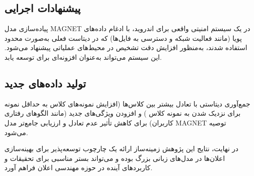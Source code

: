 \subsection{پیشنهادات اجرایی}
پیاده‌سازی مدل MAGNET در یک سیستم امنیتی واقعی برای اندروید، با ادغام داده‌های پویا (مانند فعالیت شبکه و دسترسی به فایل‌ها) که در دیتاست فعلی به‌صورت محدود استفاده شدند، به‌منظور افزایش دقت تشخیص در محیط‌های عملیاتی پیشنهاد می‌شود. این سیستم می‌تواند به‌عنوان افزونه‌ای برای  \cite{GooglePlayProtect} توسعه یابد.

\subsection{تولید داده‌های جدید}
جمع‌آوری دیتاستی با تعادل بیشتر بین کلاس‌ها (افزایش نمونه‌های کلاس  به حداقل  نمونه برای نزدیک شدن به  نمونه کلاس ) و افزودن ویژگی‌های جدید (مانند الگوهای رفتاری کاربران) برای کاهش تأثیر عدم تعادل و ارزیابی جامع‌تر مدل MAGNET توصیه می‌شود.

در نهایت، نتایج این پژوهش زمینه‌ساز ارائه یک چارچوب توسعه‌پذیر برای بهینه‌سازی اعلان‌ها در مدل‌های زبانی بزرگ بوده و می‌تواند بستر مناسبی برای تحقیقات و کاربردهای آینده در حوزه مهندسی اعلان فراهم آورد.
